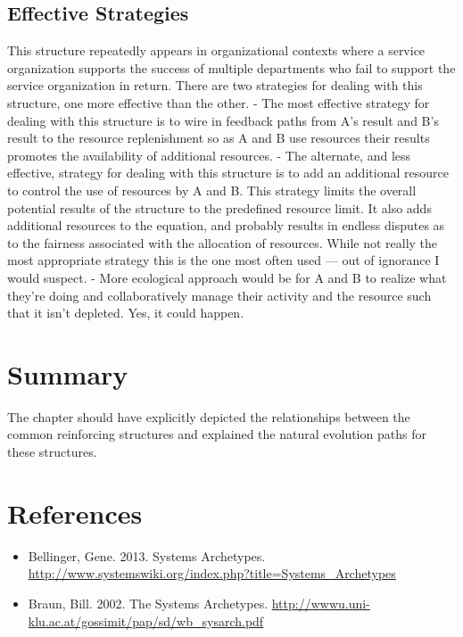 \documentclass[]{memoir}
\begin{document}
\subsection{Effective Strategies}

This structure repeatedly appears in organizational contexts where a
service organization supports the success of multiple departments who
fail to support the service organization in return. There are two
strategies for dealing with this structure, one more effective than the
other. - The most effective strategy for dealing with this structure is
to wire in feedback paths from A's result and B's result to the resource
replenishment so as A and B use resources their results promotes the
availability of additional resources. - The alternate, and less
effective, strategy for dealing with this structure is to add an
additional resource to control the use of resources by A and B. This
strategy limits the overall potential results of the structure to the
predefined resource limit. It also adds additional resources to the
equation, and probably results in endless disputes as to the fairness
associated with the allocation of resources. While not really the most
appropriate strategy this is the one most often used --- out of
ignorance I would suspect. - More ecological approach would be for A and
B to realize what they're doing and collaboratively manage their
activity and the resource such that it isn't depleted. Yes, it could
happen.

\section{Summary}

The chapter should have explicitly depicted the relationships between
the common reinforcing structures and explained the natural evolution
paths for these structures.

\section{References}

\begin{itemize}
\itemsep1pt\parskip0pt
\item
  Bellinger, Gene. 2013. Systems Archetypes.
  \url{http://www.systemswiki.org/index.php?title=Systems_Archetypes}
\item
  Braun, Bill. 2002. The Systems Archetypes.
  \url{http://wwwu.uni-klu.ac.at/gossimit/pap/sd/wb_sysarch.pdf}
\end{itemize}
\end{document}

